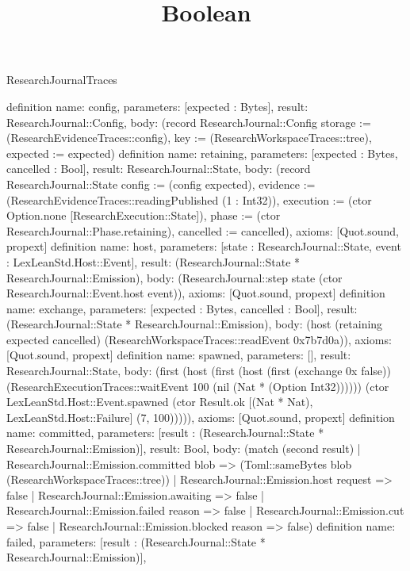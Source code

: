 \begin{lexlean}{ResearchJournalTraces}
\title{Boolean}
\begin{semanticmodule}
definition{
 name: config,
 parameters: [expected : Bytes],
 result: ResearchJournal::Config,
 body: (record ResearchJournal::Config {storage := (ResearchEvidenceTraces::config), key := (ResearchWorkspaceTraces::tree), expected := expected})
}
definition{
 name: retaining,
 parameters: [expected : Bytes, cancelled : Bool],
 result: ResearchJournal::State,
 body: (record ResearchJournal::State {config := (config expected), evidence := (ResearchEvidenceTraces::readingPublished (1 : Int32)), execution := (ctor Option.none [ResearchExecution::State]), phase := (ctor ResearchJournal::Phase.retaining), cancelled := cancelled}),
 axioms: [Quot.sound, propext]
}
definition{
 name: host,
 parameters: [state : ResearchJournal::State, event : LexLeanStd.Host::Event],
 result: (ResearchJournal::State * ResearchJournal::Emission),
 body: (ResearchJournal::step state (ctor ResearchJournal::Event.host event)),
 axioms: [Quot.sound, propext]
}
definition{
 name: exchange,
 parameters: [expected : Bytes, cancelled : Bool],
 result: (ResearchJournal::State * ResearchJournal::Emission),
 body: (host (retaining expected cancelled) (ResearchWorkspaceTraces::readEvent 0x7b7d0a)),
 axioms: [Quot.sound, propext]
}
definition{
 name: spawned,
 parameters: [],
 result: ResearchJournal::State,
 body: (first (host (first (host (first (exchange 0x false)) (ResearchExecutionTraces::waitEvent 100 (nil (Nat * (Option Int32)))))) (ctor LexLeanStd.Host::Event.spawned (ctor Result.ok [(Nat * Nat), LexLeanStd.Host::Failure] (7, 100))))),
 axioms: [Quot.sound, propext]
}
definition{
 name: committed,
 parameters: [result : (ResearchJournal::State * ResearchJournal::Emission)],
 result: Bool,
 body: (match (second result) | ResearchJournal::Emission.committed blob => (Toml::sameBytes blob (ResearchWorkspaceTraces::tree)) | ResearchJournal::Emission.host request => false | ResearchJournal::Emission.awaiting => false | ResearchJournal::Emission.failed reason => false | ResearchJournal::Emission.cut => false | ResearchJournal::Emission.blocked reason => false)
}
definition{
 name: failed,
 parameters: [result : (ResearchJournal::State * ResearchJournal::Emission)],
}
\end{semanticmodule}
\end{lexlean}
